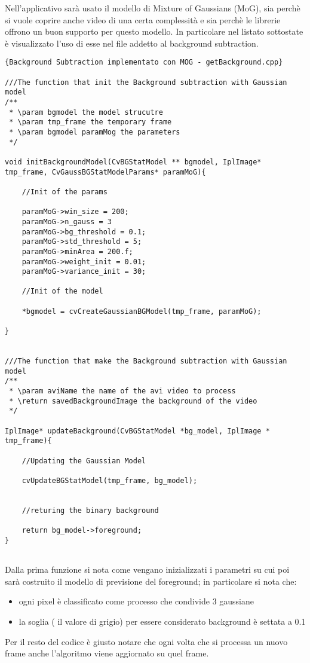 Nell'applicativo sarà usato il modello di Mixture of Gaussians (MoG), sia perchè si vuole coprire anche video di una certa complessità e sia perchè le librerie offrono un buon supporto per questo modello. In particolare nel listato sottostate è visualizzato l'uso di esse nel file addetto al background subtraction.

\lstset{language=c++}
\lstset{commentstyle=\emph}
\begin{lstlisting}[frame=r,caption=Background Subtraction implementato con MOG - getBackground.cpp ,breaklines=true,basicstyle=\small]{Background Subtraction implementato con MOG - getBackground.cpp}

///The function that init the Background subtraction with Gaussian model
/**
 * \param bgmodel the model strucutre
 * \param tmp_frame the temporary frame
 * \param bgmodel paramMog the parameters
 */

void initBackgroundModel(CvBGStatModel ** bgmodel, IplImage* tmp_frame, CvGaussBGStatModelParams* paramMoG){
	
	//Init of the params

	paramMoG->win_size = 200; 
	paramMoG->n_gauss = 3
	paramMoG->bg_threshold = 0.1;
	paramMoG->std_threshold = 5;
	paramMoG->minArea = 200.f;
	paramMoG->weight_init = 0.01;
	paramMoG->variance_init = 30; 
	
	//Init of the model

	*bgmodel = cvCreateGaussianBGModel(tmp_frame, paramMoG);
	
}


///The function that make the Background subtraction with Gaussian model
/**
 * \param aviName the name of the avi video to process
 * \return savedBackgroundImage the background of the video
 */

IplImage* updateBackground(CvBGStatModel *bg_model, IplImage * tmp_frame){
	 
	//Updating the Gaussian Model

	cvUpdateBGStatModel(tmp_frame, bg_model);
  
	
	//returing the binary background

	return bg_model->foreground;
}


\end{lstlisting}

Dalla prima funzione si nota come vengano inizializzati i parametri su cui poi sarà costruito il modello di previsione del foreground; in particolare si nota che:

\begin{itemize}
\item ogni pixel è classificato come processo che condivide 3 gaussiane 
\item la soglia ( il valore di grigio) per essere considerato background è settata a 0.1 
\end{itemize}
Per il resto del codice è giusto notare che ogni volta che si processa un nuovo frame anche l'algoritmo viene aggiornato su quel frame.


